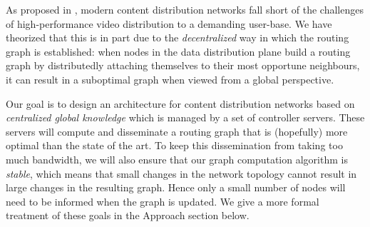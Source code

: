 As proposed in \cite{Liu:2012:CCI:2342356.2342431}, modern content distribution networks fall short of the challenges of high-performance video distribution to a demanding user-base. We have theorized that this is in part due to the {\em decentralized} way in which the routing graph is established: when nodes in the data distribution plane build a routing graph by distributedly attaching themselves to their most opportune neighbours, it can result in a suboptimal graph when viewed from a global perspective.

Our goal is to design an architecture for content distribution networks based on {\em centralized global knowledge} which is managed by a set of controller servers. These servers will compute and disseminate a routing graph that is (hopefully) more optimal than the state of the art.
To keep this dissemination from taking too much bandwidth, we will also ensure that our graph computation algorithm is {\em stable}, which means that small changes in the network topology cannot result in large changes in the resulting graph.
Hence only a small number of nodes will need to be informed when the graph is updated.
We give a more formal treatment of these goals in the Approach section below.
